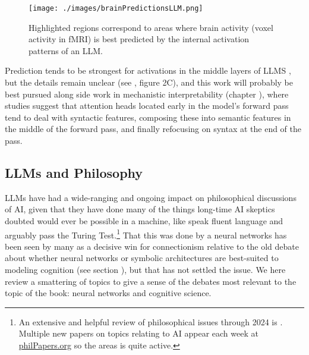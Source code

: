 \begin{figure}[ht]
\centering
\texttt{[image: ./images/brainPredictionsLLM.png]}
\caption[From \cite{schrimpf2021neural}.]{Highlighted regions correspond to
areas where brain activity (voxel activity in fMRI) is best predicted by
the internal activation patterns of an LLM.}
\label{brainPredictionLLM}
\end{figure}

Prediction tends to be strongest for activations in the middle layers of LLMS
\cite{caucheteux2022brains}, but the details remain unclear (see
\cite{schrimpf2021neural}, figure 2C), and this work will probably be best
pursued along side work in mechanistic interpretability  (chapter
), where studies suggest that attention heads located
early in the model's forward pass tend to deal with syntactic features,
composing these into semantic features in the middle of the forward pass, and
finally refocusing on syntax at the end of the pass.


\subsection{LLMs and Philosophy}\label{llmPhilosophy}

LLMs have had a wide-ranging and ongoing impact on philosophical discussions of
AI, given that they have done many of the things long-time AI skeptics doubted
would ever be possible in a machine, like speak fluent language and arguably
pass the Turing Test.\footnote{An extensive and helpful review of philosophical
issues through 2024 is \cite{milliere2024philosophical1,
milliere2024philosophical2}. Multiple new papers on topics relating to AI
appear each week at \url{philPapers.org} so the areas is quite active.} That
this was done by a neural networks has been seen by many as a decisive win for
connectionism relative to the old debate about whether neural networks or
symbolic architectures are best-suited to modeling cognition (see section
), but that has not settled the issue. We here review  a
smattering of topics to give a sense of the debates most relevant to the topic
of the book: neural networks and cognitive science.  

